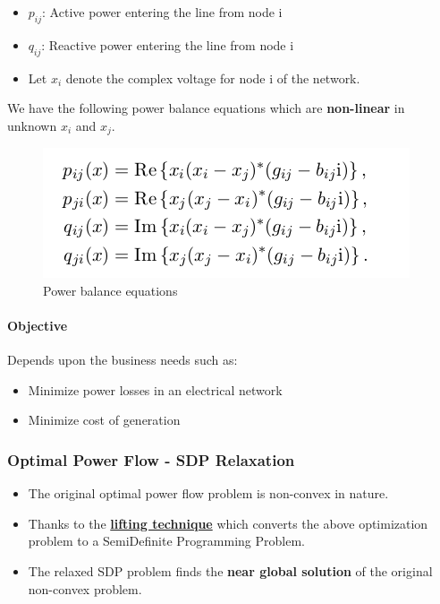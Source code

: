 \documentclass[11pt]{article}
\makeatletter
\def\maxwidth{\ifdim\Gin@nat@width>\linewidth\linewidth
    \else\Gin@nat@width\fi}
\let\Oldincludegraphics\includegraphics
\renewcommand{\includegraphics}[1]{\Oldincludegraphics[width=.8\maxwidth]{#1}}
\providecommand{\tightlist}{%
      \setlength{\itemsep}{0pt}\setlength{\parskip}{0pt}}
\makeatother
\begin{document}
\begin{itemize}
\tightlist
\item
  \(p_{ij}\): Active power entering the line from node i
\item
  \(q_{ij}\): Reactive power entering the line from node i
\item
  Let \(x_{i}\) denote the complex voltage for node i of the network.
\end{itemize}

We have the following power balance equations which are
\textbf{non-linear} in unknown \(x_{i}\) and \(x_{j}\).

\begin{figure}
\centering
\includegraphics{Power_Network_3.png}
\caption{Power balance equations}
\end{figure}

    \paragraph{Objective}\label{objective}

Depends upon the business needs such as:

\begin{itemize}
\tightlist
\item
  Minimize power losses in an electrical network
\item
  Minimize cost of generation
\end{itemize}

    \subsubsection{Optimal Power Flow - SDP
Relaxation}\label{optimal-power-flow---sdp-relaxation}

\begin{itemize}
\tightlist
\item
  The original optimal power flow problem is non-convex in nature.
\item
  Thanks to the
  \href{https://www.informs.org/content/download/320453/3031884/version/2/file/OStoday2016.pdf}{\textbf{lifting
  technique}} which converts the above optimization problem to a
  SemiDefinite Programming Problem.
\item
  The relaxed SDP problem finds the \textbf{near global solution} of the
  original non-convex problem.
\end{itemize}
\end{document}
